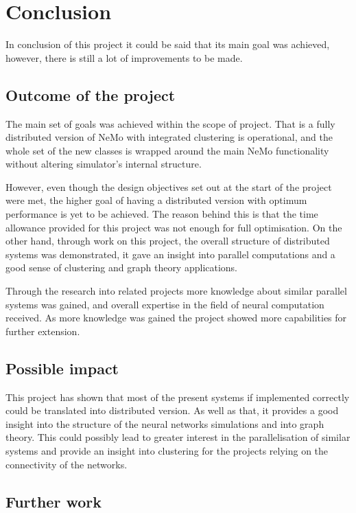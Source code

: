 \chapter{Conclusion}

In conclusion of this project it could be said that its main goal was achieved, however, there is still a lot of improvements to be made. 

\section{Outcome of the project}

The main set of goals was achieved within the scope of project. That is a fully distributed version of NeMo with integrated clustering is operational, and the whole set of the new classes is wrapped around the main NeMo functionality without altering simulator's internal structure.

However, even though the design objectives set out at the start of the project were met, the higher goal of having a distributed version with optimum performance is yet to be achieved. The reason behind this is that the time allowance provided for this project was not enough for full optimisation. On the other hand, through work on this project, the overall structure of distributed systems was demonstrated, it gave an insight into parallel computations and a good sense of clustering and graph theory applications.

Through the research into related projects more knowledge about similar parallel systems was gained, and overall expertise in the field of neural computation received. As more knowledge was gained the project showed more capabilities for further extension.

\section{Possible impact}

This project has shown that most of the present systems if implemented correctly could be translated into distributed version. As well as that, it provides a good insight into the structure of the neural networks simulations and into graph theory. This could possibly lead to greater interest in the parallelisation of similar systems and provide an insight into clustering for the projects relying on the connectivity of the networks.

\section{Further work}

